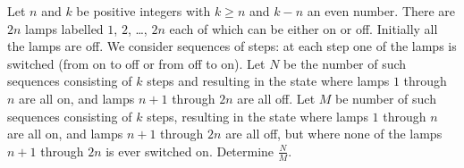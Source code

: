 Let $n$ and $k$ be positive integers with $k \geq n$ and $k - n$ an even number.
There are $2n$ lamps labelled $1$, $2$, \dots, $2n$ each of which can be either on or off.
Initially all the lamps are off.
We consider sequences of steps: at each step one of the lamps is switched
(from on to off or from off to on).
Let $N$ be the number of such sequences consisting of $k$ steps
and resulting in the state where lamps $1$ through $n$ are all on,
and lamps $n + 1$ through $2n$ are all off.
Let $M$ be number of such sequences consisting of $k$ steps,
resulting in the state where lamps $1$ through $n$ are all on,
and lamps $n + 1$ through $2n$ are all off,
but where none of the lamps $n + 1$ through $2n$ is ever switched on.
Determine $\frac{N}{M}$.